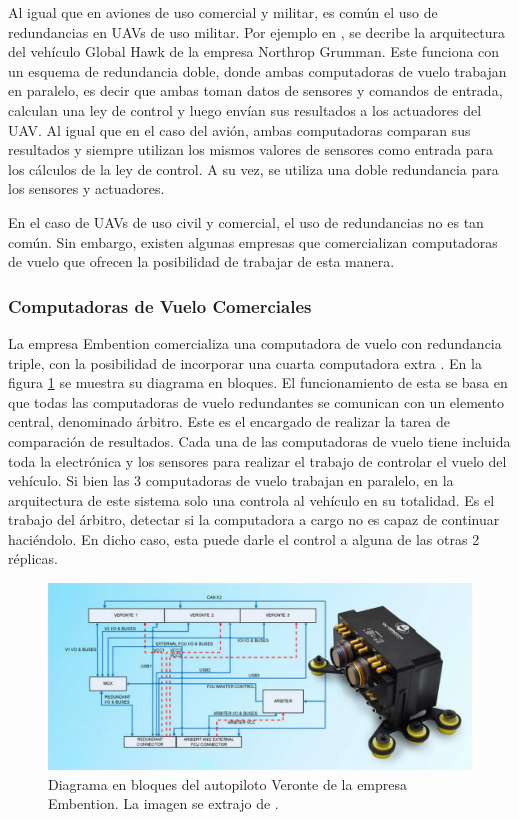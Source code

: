 Al igual que en aviones de uso comercial y militar, es común el uso de redundancias en UAVs de uso militar. Por ejemplo en \cite{821966}, se decribe la arquitectura del vehículo Global Hawk de la empresa Northrop Grumman. Este funciona con un esquema de redundancia doble, donde ambas computadoras de vuelo trabajan en paralelo, es decir que ambas toman datos de sensores y comandos de entrada, calculan una ley de control y luego envían sus resultados a los actuadores del UAV. Al igual que en el caso del avión, ambas computadoras comparan sus resultados y siempre utilizan los mismos valores de sensores como entrada para los cálculos de la ley de control. A su vez, se utiliza una doble redundancia para los sensores y actuadores.

En el caso de UAVs de uso civil y comercial, el uso de redundancias no es tan común. Sin embargo, existen algunas empresas que comercializan computadoras de vuelo que ofrecen la posibilidad de trabajar de esta manera. %

\subsubsection{Computadoras de Vuelo Comerciales}

La empresa Embention comercializa una computadora de vuelo con redundancia triple, con la posibilidad de incorporar una cuarta computadora extra \cite{embention-2023}. En la figura \ref{fig:Veronte_Embention} se muestra su diagrama en bloques. El funcionamiento de esta se basa en que todas las computadoras de vuelo redundantes se comunican con un elemento central, denominado árbitro. Este es el encargado de realizar la tarea de comparación de resultados. Cada una de las computadoras de vuelo tiene incluida toda la electrónica y los sensores para realizar el trabajo de controlar el vuelo del vehículo. Si bien las 3 computadoras de vuelo trabajan en paralelo, en la arquitectura de este sistema solo una controla al vehículo en su totalidad. Es el trabajo del árbitro, detectar si la computadora a cargo no es capaz de continuar haciéndolo. En dicho caso, esta puede darle el control a alguna de las otras 2 réplicas.

\begin{figure}[htb]
    \centering
    \includegraphics[width=\textwidth]{img/Veronte_Embention.png}
    \caption{Diagrama en bloques del autopiloto Veronte de la empresa Embention. La imagen se extrajo de \cite{embention-2023}.}
    \label{fig:Veronte_Embention}    
\end{figure}

